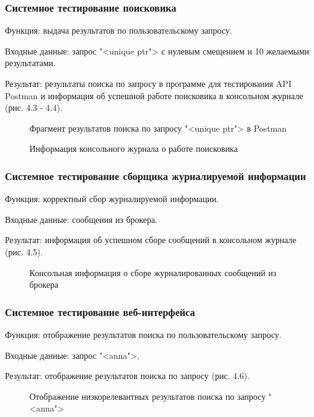 \subsubsection{Системное тестирование поисковика}

Функция: выдача результатов по пользовательскому запросу.

Входные данные: запрос "<unique ptr"> с нулевым смещением и 10 желаемыми результатами.

Результат: результаты поиска по запросу в программе для тестирования API Postman и информация об успешной работе поисковика в консольном журнале (рис. 4.3 - 4.4).

\begin{figure}[H]
\caption{Фрагмент результатов поиска по запросу "<unique ptr"> в Postman}
\label{tests/searcher_results.png:image}
\end{figure}

\begin{figure}[H]
\caption{Информация консольного журнала о работе поисковика}
\label{tests/searcher_logs.png:image}
\end{figure}

\subsubsection{Системное тестирование сборщика журналируемой информации}

Функция: корректный сбор журналируемой информации.

Входные данные: сообщения из брокера.

Результат: информация об успешном сборе сообщений в консольном журнале (рис. 4.5).

\begin{figure}[H]
\caption{Консольная информация о сборе журналированных сообщений из брокера}
\label{tests/logger.png:image}
\end{figure}

\subsubsection{Системное тестирование веб-интерфейса}

Функция: отображение результатов поиска по пользовательскому запросу.

Входные данные: запрос "<anna">.

Результат: отображение результатов поиска по запросу (рис. 4.6).

\begin{figure}[H]
\caption{Отображение низкорелевантных результатов поиска по запросу "<anna">}
\label{tests/web.png:image}
\end{figure}